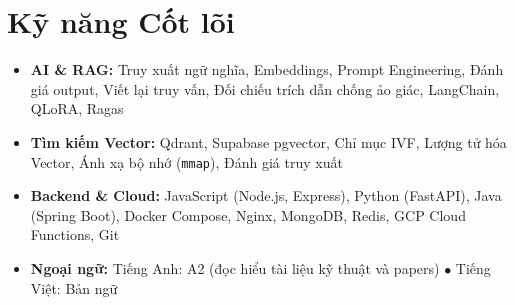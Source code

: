 \documentclass[10pt,letterpaper]{article}
\begin{document}
\section{Kỹ năng Cốt lõi}
\begin{itemize}[leftmargin=0pt, label={}, itemsep=1.0pt]
  \item \small{\textbf{AI \& RAG:} Truy xuất ngữ nghĩa, Embeddings, Prompt Engineering, Đánh giá output, Viết lại truy vấn, Đối chiếu trích dẫn chống ảo giác, LangChain, QLoRA, Ragas}
  \item \small{\textbf{Tìm kiếm Vector:} Qdrant, Supabase pgvector, Chỉ mục IVF, Lượng tử hóa Vector, Ánh xạ bộ nhớ (\texttt{mmap}), Đánh giá truy xuất}
  \item \small{\textbf{Backend \& Cloud:} JavaScript (Node.js, Express), Python (FastAPI), Java (Spring Boot), Docker Compose, Nginx, MongoDB, Redis, GCP Cloud Functions, Git}
  \item \small{\textbf{Ngoại ngữ:} Tiếng Anh: A2 (đọc hiểu tài liệu kỹ thuật và papers) $\bullet$ Tiếng Việt: Bản ngữ}
\end{itemize}
\vspace{2pt}

\end{document}
